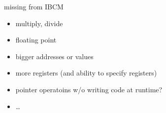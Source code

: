 \begin{frame}{missing from IBCM}
\begin{itemize}
    \item multiply, divide
    \item floating point
    \item bigger addresses or values
    \item more registers (and ability to specify registers)
    \item pointer operatoins w/o writing code at runtime?
    \item \ldots
\end{itemize}
\end{frame}

